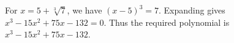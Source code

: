 For $x=5+\sqrt[3]{7}$, we have $(x-5)^3=7$. Expanding gives $x^3-15x^2+75x-132=0$. Thus the required polynomial is $\boxed{x^3-15x^2+75x-132}$.
